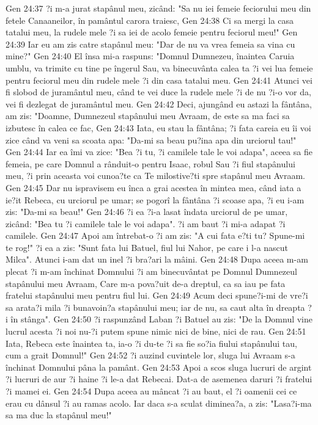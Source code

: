 Gen 24:37  ?i m-a jurat stapânul meu, zicând: "Sa nu iei femeie feciorului meu din fetele Canaaneilor, în pamântul carora traiesc,
Gen 24:38  Ci sa mergi la casa tatalui meu, la rudele mele ?i sa iei de acolo femeie pentru feciorul meu!"
Gen 24:39  Iar eu am zis catre stapânul meu: "Dar de nu va vrea femeia sa vina cu mine?"
Gen 24:40  El însa mi-a raspuns: "Domnul Dumnezeu, înaintea Caruia umblu, va trimite cu tine pe îngerul Sau, va binecuvânta calea ta ?i vei lua femeie pentru feciorul meu din rudele mele ?i din casa tatalui meu.
Gen 24:41  Atunci vei fi slobod de juramântul meu, când te vei duce la rudele mele ?i de nu ?i-o vor da, vei fi dezlegat de juramântul meu.
Gen 24:42  Deci, ajungând eu astazi la fântâna, am zis: "Doamne, Dumnezeul stapânului meu Avraam, de este sa ma faci sa izbutesc în calea ce fac,
Gen 24:43  Iata, eu stau la fântâna; ?i fata careia eu îi voi zice când va veni sa scoata apa: "Da-mi sa beau pu?ina apa din urciorul tau!"
Gen 24:44  Iar ea îmi va zice: "Bea ?i tu, ?i camilele tale le voi adapa", aceea sa fie femeia, pe care Domnul a rânduit-o pentru Isaac, robul Sau ?i fiul stapânului meu, ?i prin aceasta voi cunoa?te ca Te milostive?ti spre stapânul meu Avraam.
Gen 24:45  Dar nu ispravisem eu înca a grai acestea în mintea mea, când iata a ie?it Rebeca, cu urciorul pe umar; se pogorî la fântâna ?i scoase apa, ?i eu i-am zis: "Da-mi sa beau!"
Gen 24:46  ?i ea ?i-a lasat îndata urciorul de pe umar, zicând: "Bea tu ?i camilele tale le voi adapa". ?i am baut ?i mi-a adapat ?i camilele.
Gen 24:47  Apoi am întrebat-o ?i am zis: "A cui fata e?ti tu? Spune-mi te rog!" ?i ea a zis: "Sunt fata lui Batuel, fiul lui Nahor, pe care i l-a nascut Milca". Atunci i-am dat un inel ?i bra?ari la mâini.
Gen 24:48  Dupa aceea m-am plecat ?i m-am închinat Domnului ?i am binecuvântat pe Domnul Dumnezeul stapânului meu Avraam, Care m-a pova?uit de-a dreptul, ca sa iau pe fata fratelui stapânului meu pentru fiul lui.
Gen 24:49  Acum deci spune?i-mi de vre?i sa arata?i mila ?i bunavoin?a stapânului meu; iar de nu, sa caut alta în dreapta ?i în stânga".
Gen 24:50  ?i raspunzând Laban ?i Batuel au zis: "De la Domnul vine lucrul acesta ?i noi nu-?i putem spune nimic nici de bine, nici de rau.
Gen 24:51  Iata, Rebeca este înaintea ta, ia-o ?i du-te ?i sa fie so?ia fiului stapânului tau, cum a grait Domnul!"
Gen 24:52  ?i auzind cuvintele lor, sluga lui Avraam s-a închinat Domnului pâna la pamânt.
Gen 24:53  Apoi a scos sluga lucruri de argint ?i lucruri de aur ?i haine ?i le-a dat Rebecai. Dat-a de asemenea daruri ?i fratelui ?i mamei ei.
Gen 24:54  Dupa aceea au mâncat ?i au baut, el ?i oamenii cei ce erau cu dânsul ?i au ramas acolo. Iar daca s-a sculat diminea?a, a zis: "Lasa?i-ma sa ma duc la stapânul meu!"
